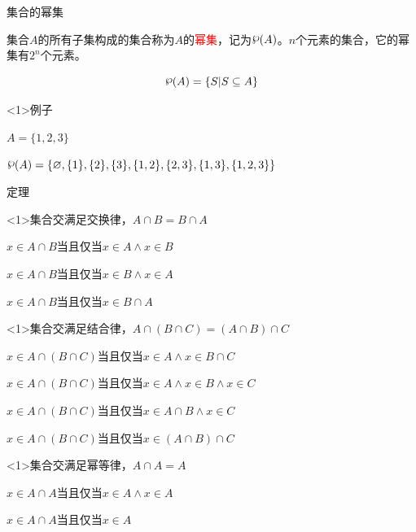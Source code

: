 \documentclass[xetex,10pt,aspectratio=43]{beamer}
\newcommand{\powerset}{\raisebox{.15\baselineskip}{\ensuremath{\wp}}}
\begin{document}
	\begin{frame}{集合的幂集}
		
		集合$A$的所有子集构成的集合称为$A$的\textcolor{red}{幂集}，记为$\powerset(A)$。$n$个元素的集合，它的幂集有$2^n$个元素。
		
		$$\powerset(A)=\{S|S\subseteq A\}$$
		
		\begin{block}<1>{例子}
			
			$A=\{1,2,3\}$
			
			$\powerset(A)=\{\varnothing,\{1\},\{2\},\{3\},\{1,2\},\{2,3\},\{1,3\},\{1,2,3\}\}$
		\end{block}
		
	\end{frame}
		
	\begin{frame}{定理}
		
		\begin{block}<1>{集合交满足交换律，$A\cap B=B\cap A$}
			
			$x\in A\cap B$当且仅当$x\in A\wedge x\in B$
			
			$x\in A\cap B$当且仅当$x\in B\wedge x\in A$
			
			$x\in A\cap B$当且仅当$x\in B\cap A$
			
		\end{block}
	
		\begin{block}<1>{集合交满足结合律，$A\cap (B\cap C)=(A\cap B)\cap C$}
			
			$x\in A\cap(B\cap C)$当且仅当$x\in A\wedge x\in B\cap C$
			
			$x\in A\cap(B\cap C)$当且仅当$x\in A\wedge x\in B\wedge x\in C$
			
			$x\in A\cap(B\cap C)$当且仅当$x\in A\cap B\wedge x\in C$
			
			$x\in A\cap(B\cap C)$当且仅当$x\in(A\cap B)\cap C$
			
		\end{block}
		
		\begin{block}<1>{集合交满足幂等律，$A\cap A=A$}
		
			$x\in A\cap A$当且仅当$x\in A\wedge x\in A$
			
			$x\in A\cap A$当且仅当$x\in A$
		
		\end{block}
	
	\end{frame}
\end{document}

